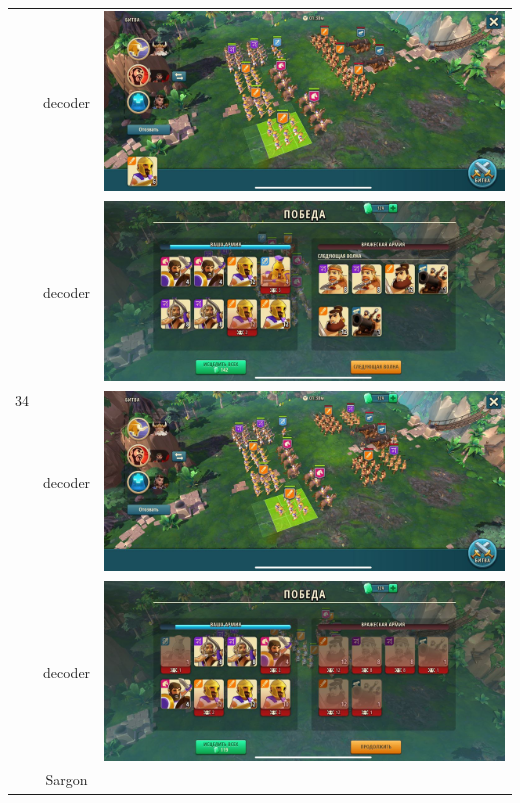\begin{longtable}{|c|c|c|}
    \hline
    \multirow{8}{*}{34} & decoder &
    \includegraphics[width=0.75\linewidth]{./parts/media/TreasureHunt/34/decoder/photo_2022-04-07_10-02-34.jpg} \\
    & decoder &
    \includegraphics[width=0.75\linewidth]{./parts/media/TreasureHunt/34/decoder/photo_2022-04-07_10-02-43.jpg} \\
    & decoder &
    \includegraphics[width=0.75\linewidth]{./parts/media/TreasureHunt/34/decoder/photo_2022-04-07_10-02-46.jpg} \\
    & decoder &
    \includegraphics[width=0.75\linewidth]{./parts/media/TreasureHunt/34/decoder/photo_2022-04-07_10-02-50.jpg} \\
    \hline
    \multirow{8}{*}{34} & Sargon &

\end{longtable}
